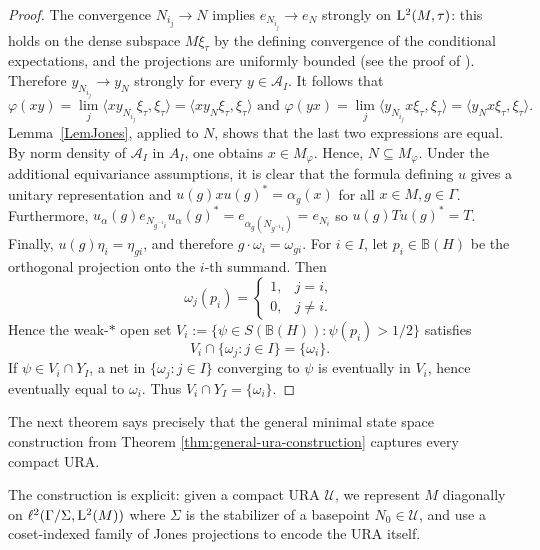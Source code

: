 \documentclass[12pt]{amsart} %
\theoremstyle{plain}
\theoremstyle{definition}
\newcommand{\B}{\mathbb{B}}
\newcommand{\LL}{{\rm L}}
\begin{document}
{\begin{proof}
The convergence $N_{i_j}\to N$ implies $e_{N_{i_j}}\longrightarrow e_N$ strongly on $\LL^2(M,\tau)$: this holds on the dense subspace
$M\xi_\tau$ by the defining convergence of the conditional expectations,
and the projections are uniformly bounded (see the proof of \cite[Theorem 4.3]{fima2026spacesucpmapssubalgebras}). Therefore
$y_{N_{i_j}}\to y_N$ strongly for every $y\in\mathcal A_{I}$. It follows
that
$$
\varphi(xy)
=\lim_j\langle x y_{N_{i_j}}\xi_\tau,\xi_\tau\rangle
=\langle x y_N\xi_\tau,\xi_\tau\rangle\text{ and }
\varphi(yx)
=\lim_j\langle y_{N_{i_j}}x\xi_\tau,\xi_\tau\rangle
=\langle y_Nx\xi_\tau,\xi_\tau\rangle.
$$
Lemma~\ref{LemJones}, applied to $N$, shows that the last two expressions
are equal. By norm density of
$\mathcal A_{I}$ in $A_I$, one obtains $x\in M_\varphi$. Hence, $N\subseteq M_\varphi$.
\medskip
\noindent Under the additional equivariance assumptions, it is clear that the formula defining $u$
gives a unitary representation and $
u(g)xu(g)^*=\alpha_g(x)$ for all $x\in M, g\in\Gamma$. Furthermore,
$u_\alpha(g)e_{N_{g^{-1}i}}u_\alpha(g)^*
=e_{\alpha_g(N_{g^{-1}i})}
=e_{N_i}$ so $u(g)Tu(g)^*=T$. Finally,
$u(g)\eta_i=\eta_{gi}$, and therefore
$g\cdot\omega_i=\omega_{gi}$. For $i\in I$, let $p_i\in\B(H)$ be the orthogonal projection onto the
$i$-th summand. Then
$$
\omega_j(p_i)=
\begin{cases}
1,&j=i,\\
0,&j\neq i.
\end{cases}
$$
Hence the weak-$*$ open set $V_i:=\{\psi\in S(\B(H)):\psi(p_i)>1/2\}$
satisfies
$$V_i\cap\{\omega_j:j\in I\}=\{\omega_i\}.$$
If
$\psi\in V_i\cap Y_I$, a net in $\{\omega_j:j\in I\}$ converging to
$\psi$ is eventually in $V_i$, hence eventually equal to $\omega_i$.
Thus $V_i\cap Y_I=\{\omega_i\}$.
\end{proof}
\noindent The next theorem says precisely that the general minimal state space construction from Theorem \ref{thm:general-ura-construction} captures every compact URA.} The construction is explicit: given a compact URA $\mathcal{U}$, we represent $M$ diagonally on $\ell^2(\Gamma/\Sigma,{\rm L}^2(M))$ where $\Sigma$ is the stabilizer of a basepoint $N_0\in\mathcal{U}$, and use a coset-indexed family of Jones projections to encode the URA itself.
\end{document}
